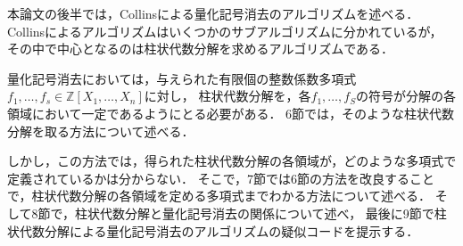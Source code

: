 \documentclass[uplatex, dvipdfmx]{jsarticle}
\theoremstyle{definition}
\begin{document}
本論文の後半では，Collinsによる量化記号消去のアルゴリズムを述べる．
Collinsによるアルゴリズムはいくつかのサブアルゴリズムに分かれているが，
その中で中心となるのは柱状代数分解を求めるアルゴリズムである．

量化記号消去においては，与えられた有限個の整数係数多項式$f_1, \dots, f_s \in \mathbb{Z}[X_1, \dots, X_n]$に対し，
柱状代数分解を，各$f_1, \dots, f_S$の符号が分解の各領域において一定であるようにとる必要がある．
6節では，そのような柱状代数分解を取る方法について述べる．

しかし，この方法では，得られた柱状代数分解の各領域が，どのような多項式で定義されているかは分からない．
そこで，7節では6節の方法を改良することで，柱状代数分解の各領域を定める多項式までわかる方法について述べる．
そして8節で，柱状代数分解と量化記号消去の関係について述べ，
最後に9節で柱状代数分解による量化記号消去のアルゴリズムの疑似コードを提示する．



\end{document}
